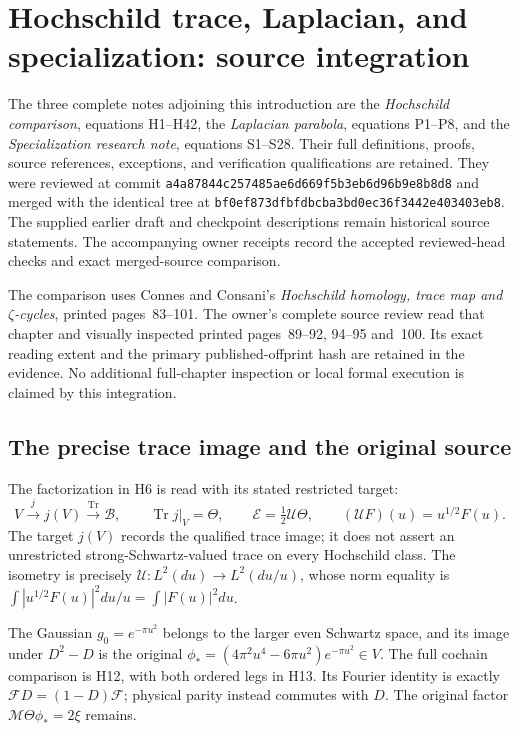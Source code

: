 \documentclass{article}
\begin{document}
\maketitle
\section{Hochschild trace, Laplacian, and specialization: source integration}
\label{sec:connes-pr27-source-integration}

The three complete notes adjoining this introduction are the
\emph{Hochschild comparison}, equations H1--H42, the
\emph{Laplacian parabola}, equations P1--P8, and the
\emph{Specialization research note}, equations S1--S28.
Their full definitions, proofs, source references, exceptions, and
verification qualifications are retained. They were reviewed at
commit \nolinkurl{a4a87844c257485ae6d669f5b3eb6d96b9e8b8d8}
and merged with the identical tree at
\nolinkurl{bf0ef873dfbfdbcba3bd0ec36f3442e403403eb8}.
The supplied earlier draft and checkpoint descriptions remain historical
source statements. The accompanying owner receipts record the accepted
reviewed-head checks and exact merged-source comparison.

The comparison uses Connes and Consani's
\emph{Hochschild homology, trace map and $\zeta$-cycles},
printed pages~83--101. The owner's complete source review read that
chapter and visually inspected printed pages~89--92, 94--95 and~100.
Its exact reading extent and the primary published-offprint hash are
retained in the evidence. No additional full-chapter inspection or
local formal execution is claimed by this integration.

\subsection{The precise trace image and the original source}

The factorization in H6 is read with its stated restricted target:
\[
 V\xrightarrow{j}j(V)\xrightarrow{\operatorname{Tr}}\mathscr B,
 \qquad \operatorname{Tr}j|_V=\Theta,
 \qquad \mathcal E=\tfrac12\mathcal U\Theta,
 \qquad(\mathcal UF)(u)=u^{1/2}F(u).
\]
The target $j(V)$ records the qualified trace image; it does not
assert an unrestricted strong-Schwartz-valued trace on every
Hochschild class. The isometry is precisely
$\mathcal U:L^2(du)\to L^2(du/u)$, whose norm equality is
$\int|u^{1/2}F(u)|^2du/u=\int|F(u)|^2du$.

The Gaussian $g_0=e^{-\pi u^2}$ belongs to the larger even Schwartz
space, and its image under $D^2-D$ is the original
$\phi_*=(4\pi^2u^4-6\pi u^2)e^{-\pi u^2}\in V$.
The full cochain comparison is H12, with both ordered legs in H13.
Its Fourier identity is exactly
$\mathcal FD=(1-D)\mathcal F$; physical parity instead commutes
with $D$. The original factor $\mathcal M\Theta\phi_*=2\xi$ remains.
\end{document}
